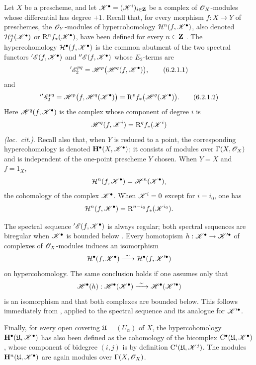 \begin{env}[6.2.1]
\label{III.6.2.1}
Let $X$ be a prescheme, and let
$\mathscr{K}^\bullet=(\mathscr{K}^i)_{i\in\mathbf{Z}}$ be a complex of
$\mathscr{O}_X$-modules whose differential has degree $+1$.
Recall that, for every morphism $f:X\to Y$ of preschemes, the
$\mathscr{O}_Y$-modules of hypercohomology
$\mathcal{H}^n(f,\mathscr{K}^\bullet)$, also denoted
$\mathcal{H}_f^n(\mathscr{K}^\bullet)$ or
$\mathrm R^n f_*(\mathscr{K}^\bullet)$, have been defined for every
$n\in\mathbf{Z}$ .  The hypercohomology
$\mathcal{H}^\bullet(f,\mathscr{K}^\bullet)$ is the common abutment of
the two spectral functors
$'\mathscr{E}(f,\mathscr{K}^\bullet)$ and
$''\mathscr{E}(f,\mathscr{K}^\bullet)$ whose $E_2$-terms are
\[
  '\mathscr{E}_2^{pq}
  =
  \mathscr{H}^p\bigl(\mathscr{H}^q(f,\mathscr{K}^\bullet)\bigr),
  \tag{6.2.1.1}\label{III.6.2.1.1}
\]
and
\[
  ''\mathscr{E}_2^{pq}
  =
  \mathscr{H}^p\bigl(f,\mathscr{H}^q(\mathscr{K}^\bullet)\bigr)
  =
  \mathrm R^p f_*\bigl(\mathscr{H}^q(\mathscr{K}^\bullet)\bigr).
  \tag{6.2.1.2}\label{III.6.2.1.2}
\]
Here $\mathscr{H}^q(f,\mathscr{K}^\bullet)$ is the complex whose component
of degree $i$ is
\[
  \mathscr{H}^q(f,\mathscr{K}^i)=\mathrm R^q f_*(\mathscr{K}^i)
\]
\emph{(loc.\ cit.)}.  Recall also that, when $Y$ is reduced to a
point, the corresponding hypercohomology is denoted
$\mathbf{H}^\bullet(X,\mathscr{K}^\bullet)$; it consists of modules
over $\Gamma(X,\mathscr{O}_X)$ and is independent of the one-point
prescheme $Y$ chosen.  When $Y=X$ and $f=1_X$,
\[
  \mathcal{H}^n(f,\mathscr{K}^\bullet)
  =
  \mathscr{H}^n(\mathscr{K}^\bullet),
\]
the cohomology of the complex $\mathscr{K}^\bullet$.  When
$\mathscr{K}^i=0$ except for $i=i_0$, one has
\[
  \mathcal{H}^n(f,\mathscr{K}^\bullet)
  =
  \mathrm R^{n-i_0}f_*(\mathscr{K}^{i_0}).
\]

The spectral sequence $'\mathscr{E}(f,\mathscr{K}^\bullet)$ is always
regular; both spectral sequences are biregular when
$\mathscr{K}^\bullet$ is bounded below .
Every homotopism
$h:\mathscr{K}^\bullet\to\mathscr{K}'^\bullet$ of complexes of
$\mathscr{O}_X$-modules  induces an isomorphism
\[
  \mathcal{H}^\bullet(f,\mathscr{K}^\bullet)
  \xrightarrow{\ \sim\ }
  \mathcal{H}^\bullet(f,\mathscr{K}'^\bullet)
\]
on hypercohomology.  The same conclusion holds if one assumes only
that
\[
  \mathscr{H}^\bullet(h):
  \mathscr{H}^\bullet(\mathscr{K}^\bullet)
  \xrightarrow{\ \sim\ }
  \mathscr{H}^\bullet(\mathscr{K}'^\bullet)
\]
is an isomorphism and that both complexes are bounded below.  This
follows immediately from , applied to the
spectral sequence  and its analogue for
$\mathscr{K}'^\bullet$.

Finally, for every open covering
$\mathfrak{U}=(U_\alpha)$ of $X$, the hypercohomology
$\mathbf{H}^\bullet(\mathfrak{U},\mathscr{K}^\bullet)$ has also been
defined  as the cohomology of the bicomplex
$\mathrm{C}^\bullet(\mathfrak{U},\mathscr{K}^\bullet)$, whose component
of bidegree $(i,j)$ is by definition
$\mathrm{C}^i(\mathfrak{U},\mathscr{K}^j)$.  The modules
$\mathbf{H}^n(\mathfrak{U},\mathscr{K}^\bullet)$ are again modules over
$\Gamma(X,\mathscr{O}_X)$.
\end{env}

